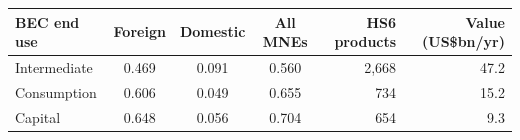 \begin{tabular}{lcccrr}
\toprule
BEC end use & Foreign & Domestic & All MNEs & HS6 products & Value (US\$bn/yr) \\
\midrule
Intermediate & 0.469 & 0.091 & 0.560 & 2,668 & 47.2 \\
Consumption & 0.606 & 0.049 & 0.655 & 734 & 15.2 \\
Capital & 0.648 & 0.056 & 0.704 & 654 & 9.3 \\
\bottomrule
\end{tabular}
